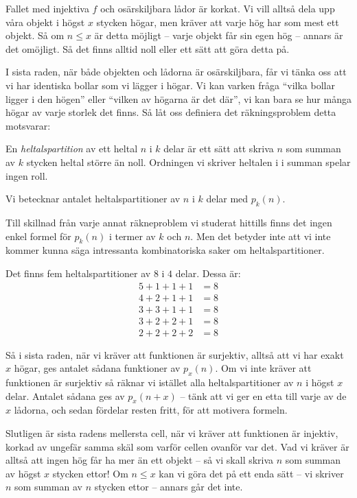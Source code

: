 \documentclass[nobib]{tufte-handout}
\begin{document}
Fallet med injektiva $f$ och osärskiljbara lådor är korkat. Vi vill alltså dela upp våra objekt i högst $x$ stycken högar, men kräver att varje hög har som mest ett objekt. Så om $n \leq x$ är detta möjligt -- varje objekt får sin egen hög -- annars är det omöjligt. Så det finns alltid noll eller ett sätt att göra detta på.

I sista raden, när både objekten och lådorna är osärskiljbara, får vi tänka oss att vi har identiska bollar som vi lägger i högar. Vi kan varken fråga ``vilka bollar ligger i den högen'' eller ``vilken av högarna är det där'', vi kan bara se hur många högar av varje storlek det finns. Så låt oss definiera det räkningsproblem detta motsvarar:

\begin{definition}
  En \emph{heltalspartition} av ett heltal $n$ i $k$ delar är ett sätt att skriva $n$ som summan av $k$ stycken heltal större än noll. Ordningen vi skriver heltalen i i summan spelar ingen roll. 
  
  Vi betecknar antalet heltalspartitioner av $n$ i $k$ delar med $p_k(n)$.
\end{definition}

Till skillnad från varje annat räkneproblem vi studerat hittills finns det ingen enkel formel för $p_k(n)$ i termer av $k$ och $n$. Men det betyder inte att vi inte kommer kunna säga intressanta kombinatoriska saker om heltalspartitioner.

\begin{example}
  Det finns fem heltalspartitioner av $8$ i $4$ delar. Dessa är:
  \begin{align*}
    5 + 1 + 1 + 1 &= 8\\
    4 + 2 + 1 + 1 &= 8\\
    3 + 3 + 1 + 1 &= 8\\
    3 + 2 + 2 + 1 &= 8\\
    2 + 2 + 2 + 2 &= 8
  \end{align*}
\end{example}

Så i sista raden, när vi kräver att funktionen är surjektiv, alltså att vi har exakt $x$ högar, ges antalet sådana funktioner av $p_x(n)$. Om vi inte kräver att funktionen är surjektiv så räknar vi istället alla heltalspartitioner av $n$ i högst $x$ delar. Antalet sådana ges av $p_x(n+x)$ -- tänk att vi ger en etta till varje av de $x$ lådorna, och sedan fördelar resten fritt, för att motivera formeln.

Slutligen är sista radens mellersta cell, när vi kräver att funktionen är injektiv, korkad av ungefär samma skäl som varför cellen ovanför var det. Vad vi kräver är alltså att ingen hög får ha mer än ett objekt -- så vi skall skriva $n$ som summan av högst $x$ stycken ettor! Om $n \leq x$ kan vi göra det på ett enda sätt -- vi skriver $n$ som summan av $n$ stycken ettor -- annars går det inte.
\end{document}
